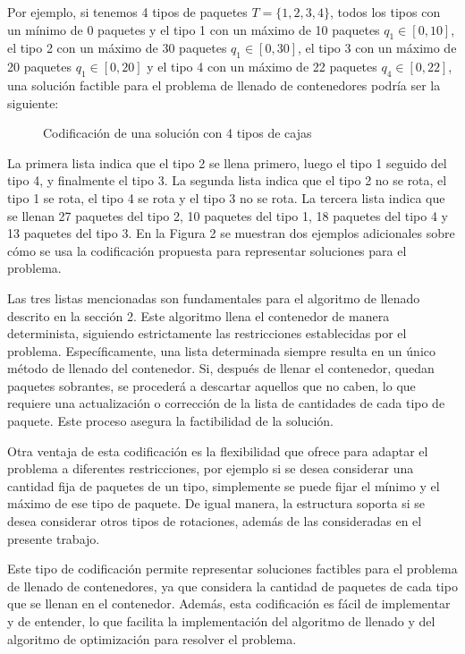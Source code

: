 \documentclass[openany]{article}
\begin{document}
Por ejemplo, si tenemos 4 tipos de paquetes $T=\{1,2,3,4\}$, todos los tipos con un mínimo de 0 paquetes y el tipo 1 con un máximo de 10 paquetes $q_1 \in [0,10]$, el tipo 2 con un máximo de 30 paquetes $q_1 \in [0,30]$, el tipo 3 con un máximo de 20 paquetes $q_1 \in [0,20]$ y el tipo 4 con un máximo de 22 paquetes $q_4 \in [0,22]$, una solución factible para el problema de llenado de contenedores podría ser la siguiente:

\begin{figure}[H]
    \centering
    
    \caption{Codificación de una solución con 4 tipos de cajas}
    \label{fig:codificación}
\end{figure}

La primera lista indica que el tipo 2 se llena primero, luego el tipo 1 seguido del tipo 4, y finalmente el tipo 3. La segunda lista indica que el tipo 2 no se rota, el tipo 1 se rota, el tipo 4 se rota y el tipo 3 no se rota. La tercera lista indica que se llenan 27 paquetes del tipo 2, 10 paquetes del tipo 1, 18 paquetes del tipo 4 y 13 paquetes del tipo 3. En la Figura 2 se muestran dos ejemplos adicionales sobre cómo se usa la codificación propuesta para representar soluciones para el problema.

Las tres listas mencionadas son fundamentales para el algoritmo de llenado descrito en la sección 2. Este algoritmo llena el contenedor de manera determinista, siguiendo estrictamente las restricciones establecidas por el problema. Específicamente, una lista determinada siempre resulta en un único método de llenado del contenedor. Si, después de llenar el contenedor, quedan paquetes sobrantes, se procederá a descartar aquellos que no caben, lo que requiere una actualización o corrección de la lista de cantidades de cada tipo de paquete. Este proceso asegura la factibilidad de la solución.

Otra ventaja de esta codificación es la flexibilidad que ofrece para adaptar el problema a diferentes restricciones, por ejemplo si se desea considerar una cantidad fija de paquetes de un tipo, simplemente se puede fijar el mínimo y el máximo de ese tipo de paquete. De igual manera, la estructura soporta si se desea considerar otros tipos de rotaciones, además de las consideradas en el presente trabajo.

Este tipo de codificación permite representar soluciones factibles para el problema de llenado de contenedores, ya que considera la cantidad de paquetes de cada tipo que se llenan en el contenedor. Además, esta codificación es fácil de implementar y de entender, lo que facilita la implementación del algoritmo de llenado y del algoritmo de optimización para resolver el problema.
\end{document}
